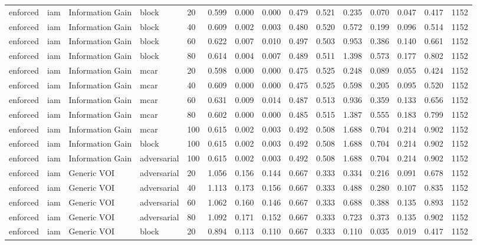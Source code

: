 \begin{table}[!ht]
{\begin{tabular}{lllllllllllllll}
enforced & iam & Information Gain & block & 20 & 0.599 & 0.000 & 0.000 & 0.479 & 0.521 & 0.235 & 0.070 & 0.047 & 0.417 & 1152 \\
enforced & iam & Information Gain & block & 40 & 0.609 & 0.002 & 0.003 & 0.480 & 0.520 & 0.572 & 0.199 & 0.096 & 0.514 & 1152 \\
enforced & iam & Information Gain & block & 60 & 0.622 & 0.007 & 0.010 & 0.497 & 0.503 & 0.953 & 0.386 & 0.140 & 0.661 & 1152 \\
enforced & iam & Information Gain & block & 80 & 0.614 & 0.004 & 0.007 & 0.489 & 0.511 & 1.398 & 0.573 & 0.177 & 0.802 & 1152 \\
enforced & iam & Information Gain & mcar & 20 & 0.598 & 0.000 & 0.000 & 0.475 & 0.525 & 0.248 & 0.089 & 0.055 & 0.424 & 1152 \\
enforced & iam & Information Gain & mcar & 40 & 0.609 & 0.000 & 0.000 & 0.475 & 0.525 & 0.598 & 0.205 & 0.095 & 0.520 & 1152 \\
enforced & iam & Information Gain & mcar & 60 & 0.631 & 0.009 & 0.014 & 0.487 & 0.513 & 0.936 & 0.359 & 0.133 & 0.656 & 1152 \\
enforced & iam & Information Gain & mcar & 80 & 0.602 & 0.000 & 0.000 & 0.485 & 0.515 & 1.387 & 0.555 & 0.183 & 0.799 & 1152 \\
enforced & iam & Information Gain & mcar & 100 & 0.615 & 0.002 & 0.003 & 0.492 & 0.508 & 1.688 & 0.704 & 0.214 & 0.902 & 1152 \\
enforced & iam & Information Gain & block & 100 & 0.615 & 0.002 & 0.003 & 0.492 & 0.508 & 1.688 & 0.704 & 0.214 & 0.902 & 1152 \\
enforced & iam & Information Gain & adversarial & 100 & 0.615 & 0.002 & 0.003 & 0.492 & 0.508 & 1.688 & 0.704 & 0.214 & 0.902 & 1152 \\
enforced & iam & Generic VOI & adversarial & 20 & 1.056 & 0.156 & 0.144 & 0.667 & 0.333 & 0.334 & 0.216 & 0.091 & 0.678 & 1152 \\
enforced & iam & Generic VOI & adversarial & 40 & 1.113 & 0.173 & 0.156 & 0.667 & 0.333 & 0.488 & 0.280 & 0.107 & 0.835 & 1152 \\
enforced & iam & Generic VOI & adversarial & 60 & 1.062 & 0.160 & 0.146 & 0.667 & 0.333 & 0.688 & 0.388 & 0.135 & 0.893 & 1152 \\
enforced & iam & Generic VOI & adversarial & 80 & 1.092 & 0.171 & 0.152 & 0.667 & 0.333 & 0.723 & 0.373 & 0.135 & 0.902 & 1152 \\
enforced & iam & Generic VOI & block & 20 & 0.894 & 0.113 & 0.110 & 0.667 & 0.333 & 0.110 & 0.035 & 0.019 & 0.417 & 1152 \\

\end{tabular}}
\end{table}
